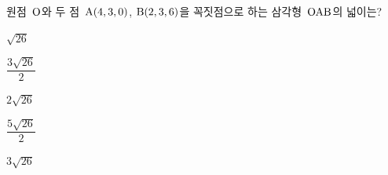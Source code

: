 원점~$\mathrm{O}$와 두 점~$\mathrm{A}(4{,}\mkern3mu\mathopen{}3{,}\mkern3mu\mathopen{}0)$, $\mathrm{B}(2{,}\mkern3mu\mathopen{}3{,}\mkern3mu\mathopen{}6)$을 꼭짓점으로 하는 삼각형~$\mathrm{OAB}$의 넓이는?
\begin{choices32}{\rule[-3ex]{0pt}{8ex}$\sqrt{26}$}{\rule[-3ex]{0pt}{8ex}$\dfrac{3\sqrt{26}}{2}$}{\rule[-3ex]{0pt}{8ex}$2\sqrt{26}$}{\rule[-3ex]{0pt}{8ex}$\dfrac{5\sqrt{26}}{2}$}{\rule[-3ex]{0pt}{8ex}$3\sqrt{26}$}\end{choices32}
